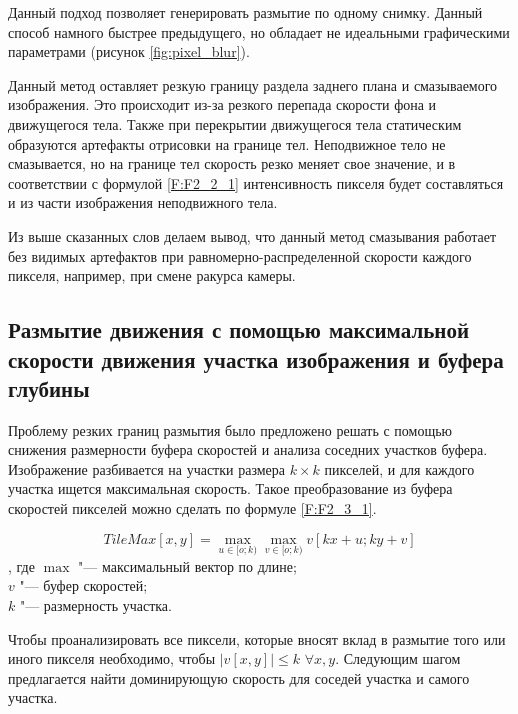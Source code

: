 Данный подход позволяет генерировать размытие по одному снимку. Данный способ намного быстрее предыдущего, но обладает не идеальными графическими параметрами (рисунок \ref{fig:pixel_blur}).


\par
Данный метод оставляет резкую границу раздела заднего плана и смазываемого изображения. Это происходит из-за резкого перепада скорости фона и движущегося тела. Также при перекрытии движущегося тела статическим образуются артефакты отрисовки на границе тел. Неподвижное тело не смазывается, но на границе тел скорость резко меняет свое значение, и в соответствии с формулой \eqref{F:F2_2_1} интенсивность пикселя будет составляться и из части изображения неподвижного тела.
\par
Из выше сказанных слов делаем вывод, что данный метод смазывания работает без видимых артефактов  при равномерно-распределенной скорости каждого пикселя, например, при смене ракурса камеры.

\subsection{Размытие движения с помощью максимальной скорости движения участка изображения и буфера глубины}
\label{cha:analysis_mcgiure}

Проблему резких границ размытия было предложено решать с помощью снижения размерности буфера скоростей и анализа соседних участков буфера. Изображение разбивается на участки размера $k \times k$ пикселей, и для каждого участка ищется максимальная скорость. Такое преобразование из буфера скоростей пикселей можно сделать по формуле \eqref{F:F2_3_1}.
\begin{eqndesc}
    \begin{equation}\label{F:F2_3_1}
        TileMax[x,y] = \max_{u \in [o ; k)} {
        \max_{v \in [o ; k)} {v [kx + u; ky + v]}
        }
    \end{equation}
    , где $\max$ "--- максимальный вектор по длине; \\
    $v$ "---  буфер скоростей;\\
    $k$ "---  размерность участка.

\end{eqndesc}

Чтобы проанализировать все пиксели, которые вносят вклад в размытие того или иного пикселя необходимо, чтобы $|v[x,y]| \le k $ \space $\forall x,y $. Следующим шагом предлагается найти доминирующую скорость для соседей участка и самого участка.

